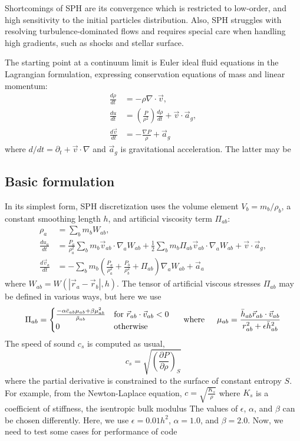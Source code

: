 \documentclass{article}
\begin{document}
Shortcomings of SPH are its convergence which is restricted to low-order, 
and high sensitivity to the initial particles distribution. 
Also, SPH struggles with resolving turbulence-dominated flows and requires
special care when handling high gradients, such as shocks and stellar surface.

The starting point at a continuum limit is Euler ideal fluid equations in the
Lagrangian formulation, expressing conservation equations of mass and linear
momentum:
\begin{align}
\frac{d \rho}{d t} &= - \rho \nabla \cdot \vec{v}, \\
\frac{d u}{d t} &= \left( \frac{P}{\rho^2} \right) \frac{d \rho}{d t} +
\vec{v}\cdot\vec{a}_g, \\
\frac{d \vec{v}}{d t} &= - \frac{\nabla P}{\rho} + \vec{a}_g
\end{align}
where $d/dt = \partial_t + \vec{v} \cdot \nabla$ and $\vec{a}_g$ is
gravitational acceleration. The latter may be 

\subsection{Basic formulation}

In its simplest form, SPH discretization uses the volume element 
$V_b = m_b / \rho_b$, a constant smoothing length $h$, and artificial
viscosity term $\Pi_{ab}$:
\begin{align}
  \rho_a &= \sum_b m_b W_{ab}, 
\\
  \frac{d u_a}{dt}  
      &= \frac{P_a}{\rho_a^2} \sum_b m_b \vec{v}_{ab} \cdot \nabla_a W_{ab} 
       + \frac12\sum_b m_b \Pi_{ab} \vec{v}_{ab} \cdot \nabla_a W_{ab}
       + \vec{v}\cdot\vec{a}_g,
\\
  \frac{d \vec{v}_a}{d t} &= -\sum_b m_b 
      \left( \frac{P_a}{\rho_a^2} 
           + \frac{P_b}{\rho_b^2} 
           + \Pi_{ab} \right) \nabla_a W_{ab}
       + \vec{a}_a
\end{align}
where $W_{ab} = W(| \vec{r}_a - \vec{r}_b |,h)$.
The tensor of artificial viscous stresses $\Pi_{ab}$ may be defined in various
ways, but here we use
\begin{equation}
\Pi_{ab} = \begin{cases}
\frac{- \alpha \bar{c}_{ab} \mu_{ab} + \beta \mu_{ab}^2}{\bar{\rho}_{ab}} & \text{for $\vec{r}_{ab} \cdot \vec{v}_{ab} < 0$} \\
0 & \text{otherwise}
\end{cases}
\indent \text{where} \indent \mu_{ab} = \frac{\bar{h}_{ab} \vec{r}_{ab} \cdot \vec{v}_{ab}}{r^2_{ab} + \epsilon \bar{h}_{ab}^2}
\end{equation}
The speed of sound $c_s$ is computed as usual,
\begin{equation}
c_s = \sqrt{\left(\frac{\partial P}{\partial \rho}\right)_S}
\end{equation}
where the partial derivative is constrained to the surface of constant entropy
$S$.
For example, from the Newton-Laplace equation, $c = \sqrt{\frac{K_s}{\rho}}$ where $K_s$ is a coefficient of stiffness, the isentropic bulk modulus
The values of $\epsilon$, $\alpha$, and $\beta$ can be chosen differently. Here, we use $\epsilon = 0.01h^2$, $\alpha = 1.0$, and $\beta = 2.0$.
Now, we need to test some cases for performance of code
\end{document}
